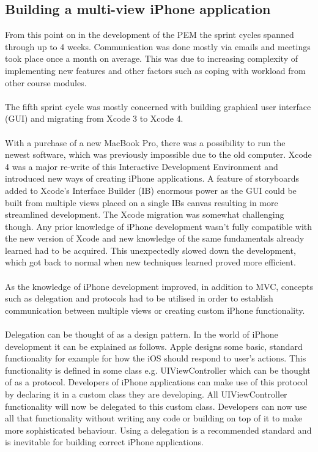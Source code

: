 \documentclass[12pt, a4paper]{report}   %
\begin{document}
\begin{enumerate}
\section{Building a multi-view iPhone application}
From this point on in the development of the PEM the sprint cycles spanned through up to 4 weeks. Communication was done mostly via emails and meetings took place once a month on average. This was due to increasing complexity of implementing new features and other factors such as coping with workload from other course modules.\\ \\
The fifth sprint cycle was mostly concerned with building graphical user interface (GUI) and migrating from Xcode 3 to Xcode 4.\\ \\
With a purchase of a new MacBook Pro, there was a possibility to run the newest software, which was previously impossible due to the old computer. Xcode 4 was a major re-write of this Interactive Development Environment and introduced new ways of creating iPhone applications. A feature of storyboards added to Xcode's Interface Builder (IB) enormous power as the GUI could be built from multiple views placed on a single IBs canvas resulting in more streamlined development. The Xcode migration was somewhat challenging though. Any prior knowledge of iPhone development wasn't fully compatible with the new version of Xcode and new knowledge of the same fundamentals already learned had to be acquired. This unexpectedly slowed down the development, which got back to normal when new techniques learned proved more efficient.\\ \\
As the knowledge of iPhone development improved, in addition to MVC, concepts such as delegation and protocols had to be utilised in order to establish communication between multiple views or creating custom iPhone functionality.\\ \\
Delegation can be thought of as a design pattern. In the world of iPhone development it can be explained as follows. Apple designs some basic, standard functionality for example for how the iOS should respond to user's actions. This functionality is defined in some class e.g. UIViewController which can be thought of as a protocol. Developers of iPhone applications can make use of this protocol by declaring it in a custom class they are developing. All UIViewController functionality will now be delegated to this custom class. Developers can now use all that functionality without writing any code or building on top of it to make more sophisticated behaviour. Using a delegation is a recommended standard and is inevitable for building correct iPhone applications.\\ \\

\end{enumerate}
\end{document}
